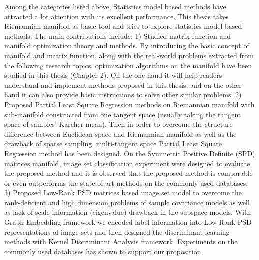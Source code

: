 \begin{eabstract}
Among the categories listed above, Statistics model based methods have attracted a lot attention with its excellent performance. This thesis takes Riemannian manifold as basic tool and tries to explore statistics model based methods. The main contributions include: 1) Studied matrix function and manifold optimization theory and methods. By introducing the basic concept of manifold and matrix function, along with the real-world problems extracted from the following research topics, optimization algorithms on the manifold have been studied in this thesis (Chapter 2). On the one hand it will help readers understand and implement methods proposed in this thesis, and on the other hand it can also provide basic instructions to solve other similar problems. 2) Proposed Partial Least Square Regression methods on Riemannian manifold with sub-manifold constructed from one tangent space (usually taking the tangent space of samples’ Karcher mean). Then in order to overcome the structure difference between Euclidean space and Riemannian manifold as well as the drawback of sparse sampling, multi-tangent space Partial Least Square Regression method has been designed. On the Symmetric Positive Definite (SPD) matrices manifold, image set classification experiment were designed to evaluate the proposed method and it is observed that the proposed method is comparable or even outperforms the state-of-art methods on the commonly used databases. 3) Proposed Low-Rank PSD matrices based image set model to overcome the rank-deficient and high dimension problems of sample covariance models as well as lack of scale information (eigenvalue) drawback in the subspace models. With Graph Embedding framework we encoded label information into Low-Rank PSD representations of image sets and then designed the discriminant learning methods with Kernel Discriminant Analysis framework. Experiments on the commonly used databases has shown to support our proposition.

%
%
\end{eabstract}

